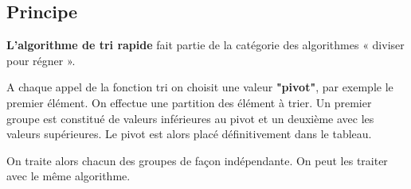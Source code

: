 \subsection{Principe}

\begin{definition2}
\textbf{L'algorithme de tri rapide} fait partie de la catégorie des algorithmes « diviser pour régner ».

A chaque appel de la fonction tri on choisit une valeur \textbf{"pivot"}, par exemple le premier élément. On effectue une partition des élément à trier. Un premier groupe est constitué de valeurs inférieures au pivot  et un deuxième avec les valeurs supérieures.
Le pivot est alors placé définitivement dans le tableau.

On traite alors chacun des groupes de façon indépendante. On peut les traiter avec le même algorithme.
\end{definition2}






